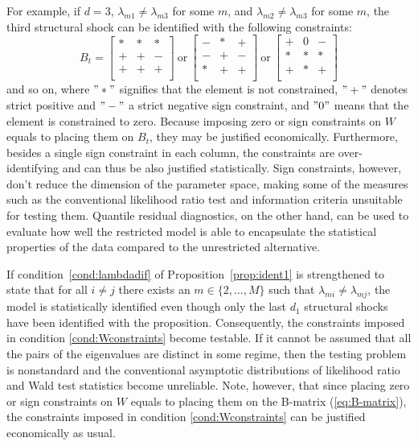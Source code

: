 \documentclass[nojss]{jss} %
\begin{document}
For example, if $d=3$, $\lambda_{m1}\neq\lambda_{m3}$ for some $m$, and $\lambda_{m2}\neq\lambda_{m3}$ for some $m$, the third structural shock can be identified with the following constraints:
\begin{equation}
B_t=\begin{bmatrix}
* & * & *    \\
+ & + &  - \\
+ & + & + \\
\end{bmatrix}
\ \text{or} \
\begin{bmatrix}
- & * & + \\
- & + & -  \\
* & + & + \\
\end{bmatrix}
\ \text{or} \
\begin{bmatrix}
+ & 0 & -  \\
* & * & *  \\
+ & * & + \\
\end{bmatrix}
\end{equation}
and so on, where $"*"$ signifies that the element is not constrained, $"+"$ denotes strict positive and $"-"$ a strict negative sign constraint, and $"0"$ means that the element is constrained to zero. Because imposing zero or sign constraints on $W$ equals to placing them on $B_t$, they may be justified economically. Furthermore, besides a single sign constraint in each column, the constraints are over-identifying and can thus be also justified statistically. Sign constraints, however, don't reduce the dimension of the parameter space, making some of the measures such as the conventional likelihood ratio test and information criteria unsuitable for testing them. Quantile residual diagnostics, on the other hand, can be used to evaluate how well the restricted model is able to encapsulate the statistical properties of the data compared to the unrestricted alternative.

If condition~\ref{cond:lambdadif} of Proposition~\ref{prop:ident1} is strengthened to state that for all $i\neq j$ there exists an $m\in\lbrace 2,...,M\rbrace$ such that $\lambda_{mi}\neq \lambda_{mj}$,  the model is statistically identified even though only the last $d_1$ structural shocks have been identified with the proposition.  Consequently,  the constraints imposed in condition \ref{cond:Wconstraints} become testable.  If it cannot be assumed that all the pairs of the eigenvalues are distinct in some regime,  then the testing problem is nonstandard and the conventional asymptotic distributions of likelihood ratio and Wald test statistics become unreliable.  Note,  however, that since placing zero or sign constraints on $W$ equals to placing them on the B-matrix (\ref{eq:B-matrix}),  the constraints imposed in condition \ref{cond:Wconstraints} can be justified economically as usual.
\end{document}
